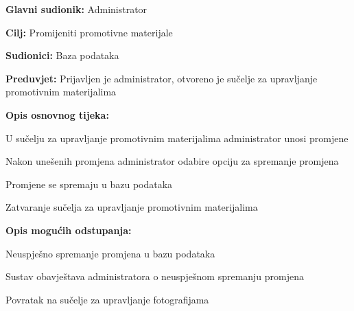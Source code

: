 					\noindent {}
					\begin{packed_item}
						
						\item \textbf{Glavni sudionik: }Administrator
						\item  \textbf{Cilj:} Promijeniti promotivne materijale
						\item  \textbf{Sudionici:} Baza podataka
						\item  \textbf{Preduvjet:} Prijavljen je administrator, otvoreno je sučelje za upravljanje promotivnim materijalima
						\item  \textbf{Opis osnovnog tijeka:}
						
						\item[] \begin{packed_enum}
							
							\item U sučelju za upravljanje promotivnim materijalima administrator unosi promjene
							\item Nakon unešenih promjena administrator odabire opciju za spremanje promjena
							\item Promjene se spremaju u bazu podataka
							\item Zatvaranje sučelja za upravljanje promotivnim materijalima
						\end{packed_enum}
						
						\item  \textbf{Opis mogućih odstupanja:}
						
						\item[] \begin{packed_item}
							
							\item[3.a] Neuspješno spremanje promjena u bazu podataka
							\item[] \begin{packed_enum}
								
								\item Sustav obavještava administratora o neuspješnom spremanju promjena
								\item Povratak na sučelje za upravljanje fotografijama
								
							\end{packed_enum}
							
						\end{packed_item}
					\end{packed_item}
					
